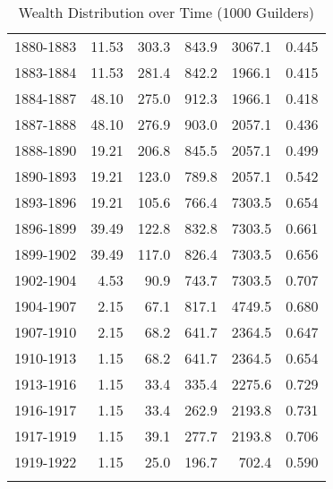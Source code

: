 \begin{table}[ht]
\begin{tabular}{lrrrrr}
  1880-1883 & 11.53 & 303.3 & 843.9 & 3067.1 & 0.445 \\ 
  1883-1884 & 11.53 & 281.4 & 842.2 & 1966.1 & 0.415 \\ 
  1884-1887 & 48.10 & 275.0 & 912.3 & 1966.1 & 0.418 \\ 
  1887-1888 & 48.10 & 276.9 & 903.0 & 2057.1 & 0.436 \\ 
  1888-1890 & 19.21 & 206.8 & 845.5 & 2057.1 & 0.499 \\ 
  1890-1893 & 19.21 & 123.0 & 789.8 & 2057.1 & 0.542 \\ 
  1893-1896 & 19.21 & 105.6 & 766.4 & 7303.5 & 0.654 \\ 
  1896-1899 & 39.49 & 122.8 & 832.8 & 7303.5 & 0.661 \\ 
  1899-1902 & 39.49 & 117.0 & 826.4 & 7303.5 & 0.656 \\ 
  1902-1904 & 4.53 & 90.9 & 743.7 & 7303.5 & 0.707 \\ 
  1904-1907 & 2.15 & 67.1 & 817.1 & 4749.5 & 0.680 \\ 
  1907-1910 & 2.15 & 68.2 & 641.7 & 2364.5 & 0.647 \\ 
  1910-1913 & 1.15 & 68.2 & 641.7 & 2364.5 & 0.654 \\ 
  1913-1916 & 1.15 & 33.4 & 335.4 & 2275.6 & 0.729 \\ 
  1916-1917 & 1.15 & 33.4 & 262.9 & 2193.8 & 0.731 \\ 
  1917-1919 & 1.15 & 39.1 & 277.7 & 2193.8 & 0.706 \\ 
  1919-1922 & 1.15 & 25.0 & 196.7 & 702.4 & 0.590 \\ 
   \hline
\multicolumn{6}{l}{}\\
\end{tabular}
\caption{Wealth Distribution over Time (1000 Guilders)} 
\label{tab:ginicoef}
\end{table}